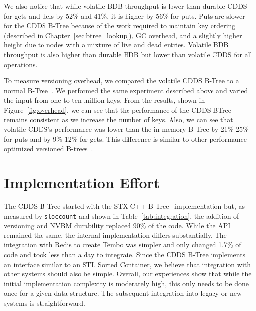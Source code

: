 
We also notice that while volatile BDB throughput is lower than
durable CDDS for gets and dels by 52\% and 41\%, it is higher by 56\%
for puts.  Puts are slower for the CDDS B-Tree because of the work
required to maintain key ordering (described in
Chapter~\ref{sec:btree_lookup}), GC overhead, and a slightly higher
height due to nodes with a mixture of live and dead entries.  Volatile
BDB throughput is also higher than durable BDB but lower than volatile
CDDS for all operations.

To measure versioning overhead, we compared the volatile CDDS
B-Tree to a normal B-Tree~\citep{Bingman08}.  We performed the same
experiment described above and varied the input from one to
ten million keys. From the results, shown in Figure~\ref{fig:overhead},
we can see that the performance of the CDDS-BTree remains consistent
as we increase the number of keys. Also, we can see that volatile
CDDS's performance was lower than the in-memory B-Tree by 21\%-25\%
for puts and by 9\%-12\% for gets. This difference is similar to other
performance-optimized versioned B-trees~\citep{Soules03}.






\section{Implementation Effort}
\label{sec:impl_effort}



The CDDS B-Tree started with the STX C++ B-Tree~\citep{Bingman08}
implementation but, as measured by \texttt{sloccount} and shown in
Table~\ref{tab:integration}, the addition of versioning and NVBM
durability replaced 90\% of the code.  While the API remained the
same, the internal implementation differs substantially.  The
integration with Redis to create Tembo was simpler and only changed
1.7\% of code and took less than a day to integrate.  Since the CDDS
B-Tree implements an interface similar to an STL Sorted Container, we
believe that integration with other systems should also be simple.
Overall, our experiences show that while the initial implementation
complexity is moderately high, this only needs to be done once for a
given data structure.  The subsequent integration into legacy
or new systems is straightforward.


